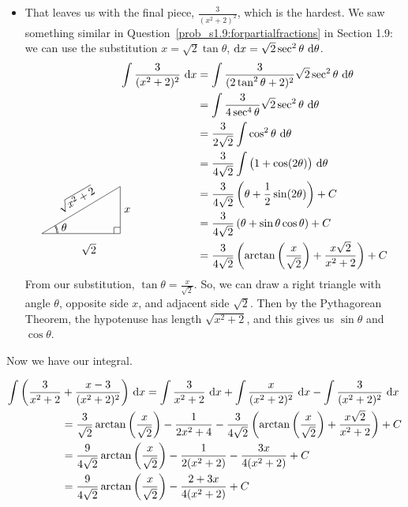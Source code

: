 \begin{solution}
\begin{itemize}
\item That leaves us with the final piece, $\frac{3}{(x^2+2)^2}$,  which is the hardest. We saw something similar in  Question~\ref{prob_s1.9:forpartialfractions} in Section 1.9: we can use the substitution $x=\sqrt{2}\tan\theta$, $\mathrm{d}x = \sqrt{2}\sec^2\theta~\mathrm{d}\theta$.
\begin{align*}
\int\frac{3}{(x^2+2)^2}~\dee{x}&=\int\frac{3}{(2\tan^2\theta+2)^2}\sqrt{2}\sec^2\theta~\dee{\theta}\\
&=\int\frac{3}{4\sec^4\theta}\sqrt{2}\sec^2\theta~\dee{\theta}\\
&=\frac{3}{2\sqrt{2}}\int\cos^2\theta~\dee{\theta}\\
&=\frac{3}{4\sqrt{2}}\int\big(1+\cos(2\theta)\big)~\dee{\theta}\\
&=\frac{3}{4\sqrt{2}}\left(\theta+\frac{1}{2}\sin(2\theta)\right)+C\\
&=\frac{3}{4\sqrt{2}}\left(\theta+\sin\theta\cos\theta\right)+C\\
\smash{\trigtri{\theta}{\sqrt2}{x}{\sqrt{x^2+2}}}\hspace{2cm}
&=\frac{3}{4\sqrt{2}}\left(\arctan\left(\frac{x}{\sqrt2}\right)+\frac{x\sqrt{2}}{x^2+2}\right)+C
\end{align*}
From our substitution, $\tan\theta = \frac{x}{\sqrt2}$. So, we can draw a right triangle with angle $\theta$, opposite side $x$, and adjacent side $\sqrt2$. Then by the Pythagorean Theorem, the hypotenuse has length $\sqrt{x^2+2}$, and this gives us $\sin\theta$ and $\cos\theta$.
\end{itemize}

 Now we have our integral.

\begin{align*}
\int\bigg(\frac{3}{x^2+2}&+\frac{x-3}{(x^2+2)^2}\bigg)
~\mathrm{d}x=
\int\frac{3}{x^2+2}~\mathrm{d}x+\int\frac{x}{(x^2+2)^2}
~\mathrm{d}x-\int\frac{3}{(x^2+2)^2}
~\mathrm{d}x\\
&=\frac{3}{\sqrt2}\arctan \left(\frac{x}{\sqrt2}\right)-\frac{1}{2x^2+4}
-\frac{3}{4\sqrt{2}}\left(\arctan\left(\frac{x}{\sqrt2}\right)+\frac{x\sqrt{2}}{x^2+2}\right)+C
\\
&=\frac{9}{4\sqrt2}\arctan \left(\frac{x}{\sqrt2}\right)-\frac{1}{2(x^2+2)}
-\frac{3x}{4(x^2+2)}+C
\\
&=\frac{9}{4\sqrt2}\arctan \left(\frac{x}{\sqrt2}\right)-\frac{2+3x}{4(x^2+2)}
+C
\end{align*}

\end{solution}


